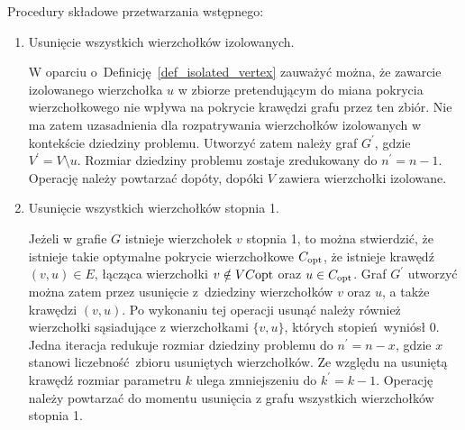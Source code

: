 Procedury składowe przetwarzania wstępnego:
\begin{enumerate}
  \item Usunięcie wszystkich wierzchołków izolowanych.

    W oparciu o~Definicję~\ref{def_isolated_vertex} zauważyć można, że zawarcie
    izolowanego wierzchołka $u$ w zbiorze pretendującym do miana pokrycia
    wierzchołkowego nie wpływa na pokrycie krawędzi grafu przez ten zbiór.
    Nie ma zatem uzasadnienia dla rozpatrywania wierzchołków izolowanych w
    kontekście dziedziny problemu.
    Utworzyć zatem należy graf $G^\prime$, gdzie $V^\prime = V \setminus u$.
    Rozmiar dziedziny problemu zostaje zredukowany do $n^\prime=n-1$.
    Operację należy powtarzać dopóty, dopóki $V$ zawiera wierzchołki izolowane.

  \item Usunięcie wszystkich wierzchołków stopnia 1.

    Jeżeli w grafie $G$ istnieje wierzchołek $v$ stopnia 1, to można 
    stwierdzić, że istnieje takie optymalne pokrycie wierzchołkowe $C_{\textnormal{opt}}$, że istnieje krawędź $(v,u) \in E$, łącząca wierzchołki $v \notin VC{\textnormal{opt}}$ oraz $u \in C_{\textnormal{opt}}$.
    Graf $G^\prime$ utworzyć można zatem przez usunięcie z~dziedziny wierzchołków $v$ oraz
    $u$, a także krawędzi $(v,u)$.
    Po wykonaniu tej operacji usunąć należy również wierzchołki sąsiadujące z wierzchołkami
    $\{v,u\}$, których stopień~wyniósł 0.
    Jedna iteracja redukuje rozmiar dziedziny problemu do $n^\prime=n-x$, gdzie
    $x$ stanowi liczebność~zbioru usuniętych wierzchołków.
    Ze względu na usuniętą krawędź rozmiar parametru $k$ ulega zmniejszeniu do
    $k^\prime=k-1$.
    Operację należy powtarzać do momentu usunięcia z grafu wszystkich
    wierzchołków stopnia 1.


\end{enumerate}
